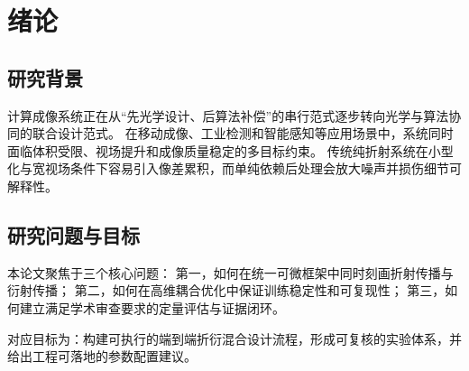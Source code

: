 \chapter{绪论}

\section{研究背景}

计算成像系统正在从“先光学设计、后算法补偿”的串行范式逐步转向光学与算法协同的联合设计范式。
在移动成像、工业检测和智能感知等应用场景中，系统同时面临体积受限、视场提升和成像质量稳定的多目标约束。
传统纯折射系统在小型化与宽视场条件下容易引入像差累积，而单纯依赖后处理会放大噪声并损伤细节可解释性。

\section{研究问题与目标}

本论文聚焦于三个核心问题：
第一，如何在统一可微框架中同时刻画折射传播与衍射传播；
第二，如何在高维耦合优化中保证训练稳定性和可复现性；
第三，如何建立满足学术审查要求的定量评估与证据闭环。

对应目标为：构建可执行的端到端折衍混合设计流程，形成可复核的实验体系，并给出工程可落地的参数配置建议。
